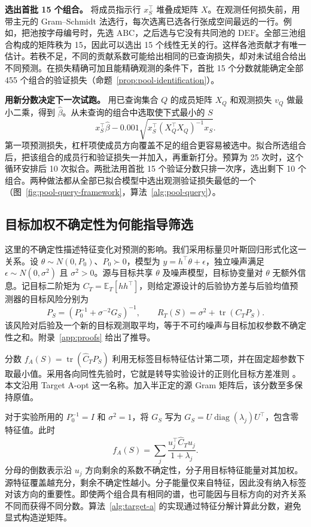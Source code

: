 \documentclass[UTF8,fontset=fandol,scheme=chinese,zihao=false,11pt,letterpaper]{ctexart}
\newcommand{\E}{\mathbb{E}}
\newcommand{\tr}{\operatorname{tr}}
\begin{document}
\noindent\textbf{选出首批 15 个组合。}
将成员指示行 $x_S^\top$ 堆叠成矩阵 $X$。在观测任何损失前，用带主元的 Gram--Schmidt 法选行，每次选离已选各行张成空间最远的一行。例如，把池按字母编号时，先选 $\mathrm{ABC}$，之后选与它没有共同池的 $\mathrm{DEF}$。全部三池组合构成的矩阵秩为 15，因此可以选出 15 个线性无关的行。这样各池贡献才有唯一估计。若秩不足，不同的贡献系数可能给出相同的已查询损失，却对未试组合给出不同预测。在损失精确可加且能精确观测的条件下，首批 15 个分数就能确定全部 455 个组合的验证损失（命题~\ref{prop:pool-identification}）。

\noindent\textbf{用新分数决定下一次试跑。}
用已查询集合 $Q$ 的成员矩阵 $X_Q$ 和观测损失 $v_Q$ 做最小二乘，得到 $\widehat\beta$。从未查询的组合中选取使下式最小的 $S$
\begin{equation}
 x_S^\top\widehat\beta-0.001\sqrt{x_S^\top(X_Q^\top X_Q)^{-1}x_S}.
 \label{eq:pool-acquisition}
\end{equation}
第一项预测损失，杠杆项使成员方向覆盖不足的组合更容易被选中。拟合所选组合后，把该组合的成员行和验证损失一并加入，再重新打分。预算为 25 次时，这个循环安排后 10 次拟合。两批法用首批 15 个验证分数只排一次序，选出剩下 10 个组合。两种做法都从全部已拟合模型中选出观测验证损失最低的一个（图~\ref{fig:pool-query-framework}，算法~\ref{alg:pool-query}）。

\subsection{目标加权不确定性为何能指导筛选}
这里的不确定性描述特征变化对预测的影响。我们采用标量贝叶斯回归形式化这一关系。设 $\theta\sim N(0,P_0)$、$P_0\succ0$，模型为 $y=h^\top\theta+\epsilon$，独立噪声满足 $\epsilon\sim N(0,\sigma^2)$ 且 $\sigma^2>0$。源与目标共享 $\theta$ 及噪声模型，目标协变量对 $\theta$ 无额外信息。记目标二阶矩为 $C_T=\E_T[hh^\top]$，则给定源设计的后验协方差与后验均值预测器的目标风险分别为
\begin{equation}
 P_S=\left(P_0^{-1}+\sigma^{-2}G_S\right)^{-1},\qquad
 R_T(S)=\sigma^2+\tr(C_TP_S).
 \label{eq:risk}
\end{equation}
该风险对后验及一个新的目标观测取平均，等于不可约噪声与目标加权参数不确定性之和。附录~\ref{app:proofs} 给出了推导。

分数 $f_A(S)=\tr(\widehat C_TP_S)$ 利用无标签目标特征估计第二项，并在固定超参数下取最小值。采用各向同性先验时，它就是转导实验设计的正则化目标方差准则 \citep{yu2006,hubotter2024transductive}。本文沿用 Target A-opt 这一名称。加入半正定的源 Gram 矩阵后，该分数至多保持原值。

对于实验所用的 $P_0^{-1}=I$ 和 $\sigma^2=1$，将 $G_S$ 写为 $G_S=U\operatorname{diag}(\lambda_j)U^\top$，包含零特征值。此时
\begin{equation}
 f_A(S)=\sum_j\frac{u_j^\top\widehat C_Tu_j}{1+\lambda_j}.
 \label{eq:target-directions}
\end{equation}
分母的倒数表示沿 $u_j$ 方向剩余的系数不确定性，分子用目标特征能量对其加权。源特征覆盖越充分，剩余不确定性越小。分子能量仅来自特征，因此没有纳入标签对该方向的重要性。即使两个组合具有相同的谱，也可能因与目标方向的对齐关系不同而获得不同分数。算法~\ref{alg:target-a} 的实现通过特征分解计算此分数，避免显式构造逆矩阵。
\end{document}
